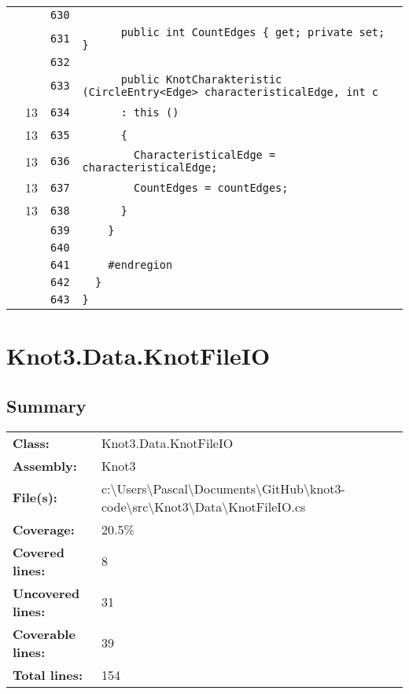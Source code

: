 \documentclass[a4paper,10pt]{article}
\begin{document}
\begin{longtable}[l]{lrrl}
\cellcolor{gray} &  & \verb~630~ & \verb~~\\
\cellcolor{gray} &  & \verb~631~ & \verb~      public int CountEdges { get; private set; }~\\
\cellcolor{gray} &  & \verb~632~ & \verb~~\\
\cellcolor{gray} &  & \verb~633~ & \verb~      public KnotCharakteristic (CircleEntry<Edge> characteristicalEdge, int c~\\
\cellcolor{green} & 13 & \verb~634~ & \verb~      : this ()~\\
\cellcolor{green} & 13 & \verb~635~ & \verb~      {~\\
\cellcolor{green} & 13 & \verb~636~ & \verb~        CharacteristicalEdge = characteristicalEdge;~\\
\cellcolor{green} & 13 & \verb~637~ & \verb~        CountEdges = countEdges;~\\
\cellcolor{green} & 13 & \verb~638~ & \verb~      }~\\
\cellcolor{gray} &  & \verb~639~ & \verb~    }~\\
\cellcolor{gray} &  & \verb~640~ & \verb~~\\
\cellcolor{gray} &  & \verb~641~ & \verb~    #endregion~\\
\cellcolor{gray} &  & \verb~642~ & \verb~  }~\\
\cellcolor{gray} &  & \verb~643~ & \verb~}~\\
\end{longtable}
\newpage
\section{Knot3.Data.KnotFileIO}
\subsection{Summary}
\begin{longtable}[l]{ll}
\textbf{Class:} & Knot3.Data.KnotFileIO\\
\textbf{Assembly:} & Knot3\\
\textbf{File(s):} & \begin{minipage}[t]{12cm}{c:\textbackslash Users\textbackslash Pascal\textbackslash Documents\textbackslash GitHub\textbackslash knot3-code\textbackslash src\textbackslash Knot3\textbackslash Data\textbackslash KnotFileIO.cs}\end{minipage} \\
\textbf{Coverage:} & 20.5\%\\
\textbf{Covered lines:} & 8\\
\textbf{Uncovered lines:} & 31\\
\textbf{Coverable lines:} & 39\\
\textbf{Total lines:} & 154\\
\end{longtable}
\end{document}
